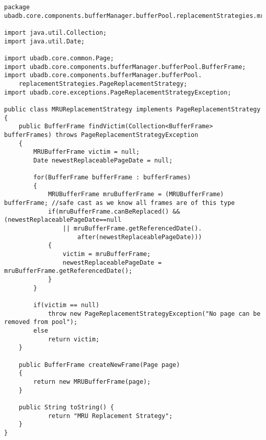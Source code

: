 \begin{lstlisting}
package ubadb.core.components.bufferManager.bufferPool.replacementStrategies.mru;

import java.util.Collection;
import java.util.Date;

import ubadb.core.common.Page;
import ubadb.core.components.bufferManager.bufferPool.BufferFrame;
import ubadb.core.components.bufferManager.bufferPool.
	replacementStrategies.PageReplacementStrategy;
import ubadb.core.exceptions.PageReplacementStrategyException;

public class MRUReplacementStrategy implements PageReplacementStrategy
{       
    public BufferFrame findVictim(Collection<BufferFrame> bufferFrames) throws PageReplacementStrategyException
    {               
    	MRUBufferFrame victim = null;
		Date newestReplaceablePageDate = null;
		
		for(BufferFrame bufferFrame : bufferFrames)
		{
			MRUBufferFrame mruBufferFrame = (MRUBufferFrame) bufferFrame; //safe cast as we know all frames are of this type
			if(mruBufferFrame.canBeReplaced() && (newestReplaceablePageDate==null 
				|| mruBufferFrame.getReferencedDate().
					after(newestReplaceablePageDate)))
			{
				victim = mruBufferFrame;
				newestReplaceablePageDate = mruBufferFrame.getReferencedDate();
			}
		}
		
		if(victim == null)
			throw new PageReplacementStrategyException("No page can be removed from pool");
		else
			return victim;
    }
    
    public BufferFrame createNewFrame(Page page) 
    {
    	return new MRUBufferFrame(page);               
    }
    
    public String toString() {
            return "MRU Replacement Strategy";
    }
}
\end{lstlisting}
